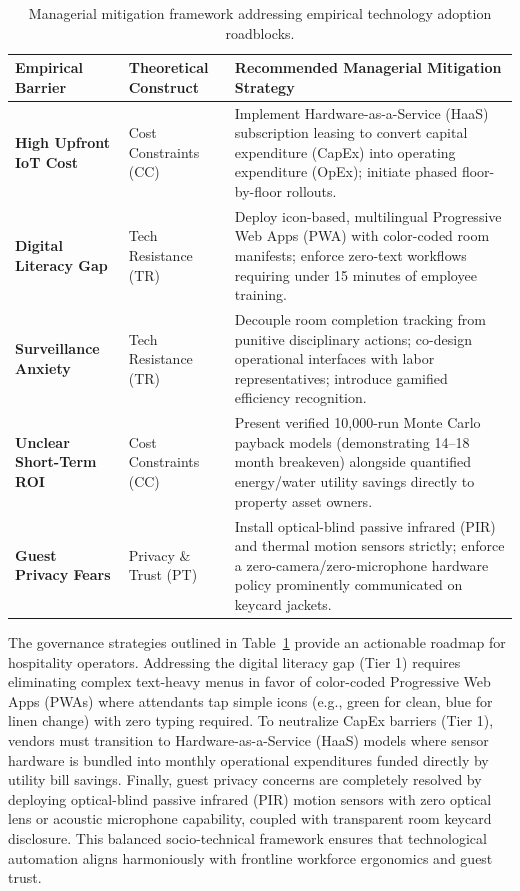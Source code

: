 \documentclass[11pt,a4paper]{article}
\begin{document}
\begin{table}[H]
\centering
\small
\caption{Managerial mitigation framework addressing empirical technology adoption roadblocks.}
\label{tab:mitigation_framework}
\begin{tabularx}{\textwidth}{p{3.2cm} p{2.6cm} X}
\toprule
\textbf{Empirical Barrier} & \textbf{Theoretical Construct} & \textbf{Recommended Managerial Mitigation Strategy} \\
\midrule
\textbf{High Upfront IoT Cost} & Cost Constraints (CC) & Implement Hardware-as-a-Service (HaaS) subscription leasing to convert capital expenditure (CapEx) into operating expenditure (OpEx); initiate phased floor-by-floor rollouts. \\
\addlinespace
\textbf{Digital Literacy Gap} & Tech Resistance (TR) & Deploy icon-based, multilingual Progressive Web Apps (PWA) with color-coded room manifests; enforce zero-text workflows requiring under 15 minutes of employee training. \\
\addlinespace
\textbf{Surveillance Anxiety} & Tech Resistance (TR) & Decouple room completion tracking from punitive disciplinary actions; co-design operational interfaces with labor representatives; introduce gamified efficiency recognition. \\
\addlinespace
\textbf{Unclear Short-Term ROI} & Cost Constraints (CC) & Present verified 10,000-run Monte Carlo payback models (demonstrating 14--18 month breakeven) alongside quantified energy/water utility savings directly to property asset owners. \\
\addlinespace
\textbf{Guest Privacy Fears} & Privacy \& Trust (PT) & Install optical-blind passive infrared (PIR) and thermal motion sensors strictly; enforce a zero-camera/zero-microphone hardware policy prominently communicated on keycard jackets. \\
\bottomrule
\end{tabularx}
\end{table}

The governance strategies outlined in Table~\ref{tab:mitigation_framework} provide an actionable roadmap for hospitality operators. Addressing the digital literacy gap (Tier 1) requires eliminating complex text-heavy menus in favor of color-coded Progressive Web Apps (PWAs) where attendants tap simple icons (e.g., green for clean, blue for linen change) with zero typing required. To neutralize CapEx barriers (Tier 1), vendors must transition to Hardware-as-a-Service (HaaS) models where sensor hardware is bundled into monthly operational expenditures funded directly by utility bill savings. Finally, guest privacy concerns are completely resolved by deploying optical-blind passive infrared (PIR) motion sensors with zero optical lens or acoustic microphone capability, coupled with transparent room keycard disclosure. This balanced socio-technical framework ensures that technological automation aligns harmoniously with frontline workforce ergonomics and guest trust.
\end{document}
